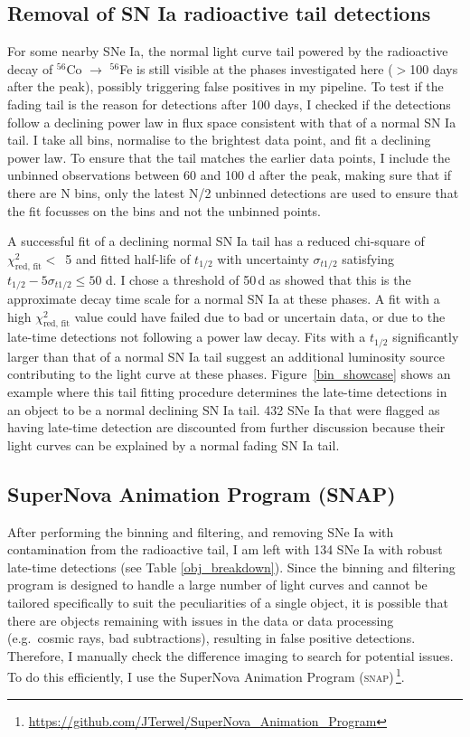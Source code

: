 \documentclass[a4paper,oneside,12pt, class=Latex/Classes/PhDthesisPSnPDF, crop=false]{standalone}
\begin{document}
\subsection{Removal of SN Ia radioactive tail detections}
\label{tail_removal}
For some nearby SNe Ia, the normal light curve tail powered by the radioactive decay of $^{56}$Co $\rightarrow$ $^{56}$Fe is still visible at the phases investigated here ($>$100 days after the peak), possibly triggering false positives in my pipeline. To test if the fading tail is the reason for detections after 100 days, I checked if the detections follow a declining power law in flux space consistent with that of a normal SN Ia tail. I take all bins, normalise to the brightest data point, and fit a declining power law. To ensure that the tail matches the earlier data points, I include the unbinned observations between 60 and 100 d after the peak, making sure that if there are N bins, only the latest N/2 unbinned detections are used to ensure that the fit focusses on the bins and not the unbinned points.

A successful fit of a declining normal SN Ia tail has a reduced chi-square of $\chi^2_\text{red, fit} <$~5 and fitted half-life of $t_{1/2}$ with uncertainty $\sigma_{t1/2}$ satisfying $t_{1/2} - 5\sigma_{t1/2} \leq 50$ d. I chose a threshold of 50\,d as \citet{Georgios_11fe} showed that this is the approximate decay time scale for a normal SN Ia at these phases. A fit with a high $\chi^2_\text{red, fit}$ value could have failed due to bad or uncertain data, or due to the late-time detections not following a power law decay. Fits with a $t_{1/2}$ significantly larger than that of a normal SN Ia tail suggest an additional luminosity source contributing to the light curve at these phases. Figure~\ref{bin_showcase} shows an example where this tail fitting procedure determines the late-time detections in an object to be a normal declining SN Ia tail. 432 SNe Ia that were flagged as having late-time detection are discounted from further discussion because their light curves can be explained by a normal fading SN Ia tail.


\subsection{SuperNova Animation Program (SNAP)}
\label{snap}
After performing the binning and filtering, and removing SNe Ia with contamination from the radioactive tail, I am left with 134 SNe Ia with robust late-time detections (see Table \ref{obj_breakdown}). Since the binning and filtering program is designed to handle a large number of light curves and cannot be tailored specifically to suit the peculiarities of a single object, it is possible that there are objects remaining with issues in the data or data processing (e.g.~cosmic rays, bad subtractions), resulting in false positive detections. Therefore, I manually check the difference imaging to search for potential issues. To do this efficiently, I use the SuperNova Animation Program (\textsc{snap})\,\footnote{\url{https://github.com/JTerwel/SuperNova_Animation_Program}}.
\end{document}
